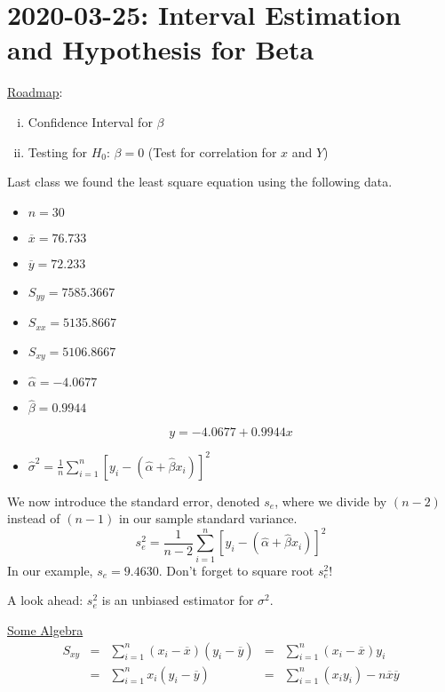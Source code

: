 \section{2020-03-25: Interval Estimation and Hypothesis for Beta}
\underline{Roadmap}:
\begin{enumerate}[(i)]
    \item Confidence Interval for $ \beta $
    \item Testing for $ H_0 $: $ \beta=0 $ (Test for correlation for
          $ x $ and $ Y $)
\end{enumerate}

\begin{exbox}
    \begin{example} \label{ex least sq}
        Last class we found the least square equation using the following data.
        \begin{itemize}
            \item $ n=30 $
            \item $ \overline{x}=76.733 $
            \item $ \overline{y}=72.233 $
            \item $ S_{yy}=7585.3667 $
            \item $ S_{xx}=5135.8667 $
            \item $ S_{xy}=5106.8667 $
            \item $ \hat{\alpha}=-4.0677 $
            \item $ \hat{\beta}=0.9944 $
        \end{itemize}
        \[ y=-4.0677+0.9944x \]
        \begin{itemize}
            \item $ \hat{\sigma}^2=\frac{1}{n} \sum\limits_{i=1}^{n} \left[ y_i-(\hat{\alpha}+\hat{\beta}x_i) \right]^2 $
        \end{itemize}
        We now introduce the standard error, denoted $ s_e $, where we divide by $ (n-2) $
        instead of $ (n-1) $ in our sample standard variance.
        \[ s_e^2=\frac{1}{n-2} \sum\limits_{i=1}^{n} \left[ y_i-(\hat{\alpha}+\hat{\beta}x_i) \right]^2 \]
        In our example, $ s_e=9.4630 $. Don't forget to square root $ s_e^2 $!

        A look ahead: $ s_e^2 $ is an unbiased estimator for $ \sigma^2 $.
    \end{example}
\end{exbox}
\underline{Some Algebra}
\[ \begin{aligned}
        S_{xy} & = & \sum\limits_{i=1}^{n} (x_i-\overline{x})(y_i-\overline{y}) & = & \sum\limits_{i=1}^{n} (x_i-\overline{x})y_i                \\
               & = & \sum\limits_{i=1}^{n} x_i(y_i-\overline{y})                & = & \sum\limits_{i=1}^{n} (x_iy_i) - n\overline{x}\overline{y}
    \end{aligned}
\]
